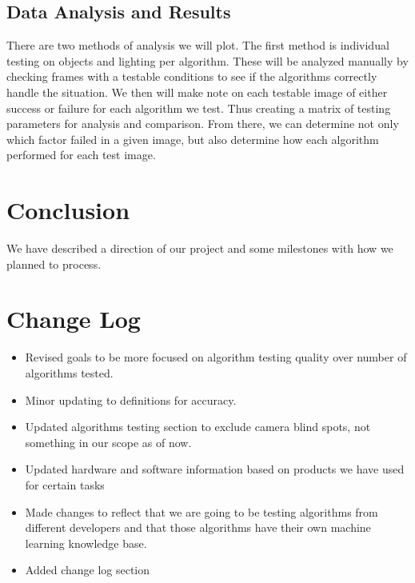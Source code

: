 \documentclass[10pt,draftclsnofoot,onecolumn,journal,compsoc]{IEEEtran}
\begin{document}
\subsection{Data Analysis and Results}
There are two methods of analysis we will plot. 
The first method is individual testing on objects and lighting per algorithm. 
These will be analyzed manually by checking frames with a testable conditions to see if the algorithms correctly handle the situation.
We then will make note on each testable image of either success or failure for each algorithm we test.
Thus creating a matrix of testing parameters for analysis and comparison.
From there, we can determine not only which factor failed in a given image, but also determine how each algorithm performed for each test image. 

\section{Conclusion}
We have described a direction of our project and some milestones with how we planned to process.
      
      
\section{Change Log}
\begin{itemize}
	\item Revised goals to be more focused on algorithm testing quality over number of algorithms tested.
	\item Minor updating to definitions for accuracy.
	\item Updated algorithms testing section to exclude camera blind spots, not something in our scope as of now.
	\item Updated hardware and software information based on products we have used for certain tasks
	\item Made changes to reflect that we are going to be testing algorithms from different developers and that those algorithms have their own machine learning knowledge base.
	\item Added change log section 
\end{itemize}

\newpage
\newcommand{\firstdayoffallterm}{2016-09-21}      %
\newcommand{\startday}{2016-10-02}                %
\newcommand{\fallprogressreportdue}{2016-12-05}   %
\newcommand{\alphareleasedue}{2017-02-13}         %
\newcommand{\betareleasedue}{2017-03-20}          %
\newcommand{\winterprogressreportdue}{2017-03-20} %
\newcommand{\releasedue}{2017-05-15}              %
\newcommand{\expoday}{2017-05-19}                 %
\newcommand{\finalreportdue}{2017-06-12}          %
\newcommand{\lastdayofspringterm}{2017-06-16}     %
\end{document}
